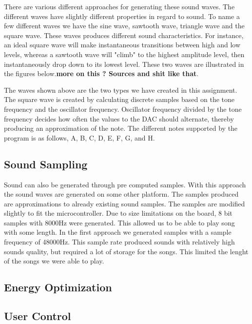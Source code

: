 There are various different approaches for generating these sound waves. The different waves have slightly different properties in regard to sound. To name a few different waves we have the sine wave, sawtooth wave, triangle wave and the square wave. These waves produces different sound characteristics. For instance, an ideal square wave will make instantaneous transitions between high and low levels, whereas a sawtooth wave will "climb" to the highest amplitude level, then instantaneously drop down to its lowest level. These two waves are illustrated in the figures below.{\bf more on this ? Sources and shit like that}. 




The waves shown above are the two types we have created in this assignment. The square wave is created by calculating discrete samples based on the tone frequency and the oscillator frequency. Oscillator frequency divided by the tone frequency decides how often the values to the DAC should alternate, thereby producing an approximation of the note. The different notes supported by the program is as follows, A, B, C, D, E, F, G, and H.


\subsection{Sound Sampling}
Sound can also be generated through pre computed samples. With this approach the sound waves are generated on some other platform. The samples produced are approximations to already existing sound samples. The samples are modified slightly to fit the microcontroller. Due to size limitations on the board, 8 bit samples with 8000Hz were generated. This allowed us to be able to play song with some length. In the first approach we generated samples with a sample frequency of 48000Hz. This sample rate produced sounds with relatively high sounds quality, but required a lot of storage for the songs. This limited the lenght of the songs we were able to play. 



\subsection{Energy Optimization}




\subsection{User Control}












